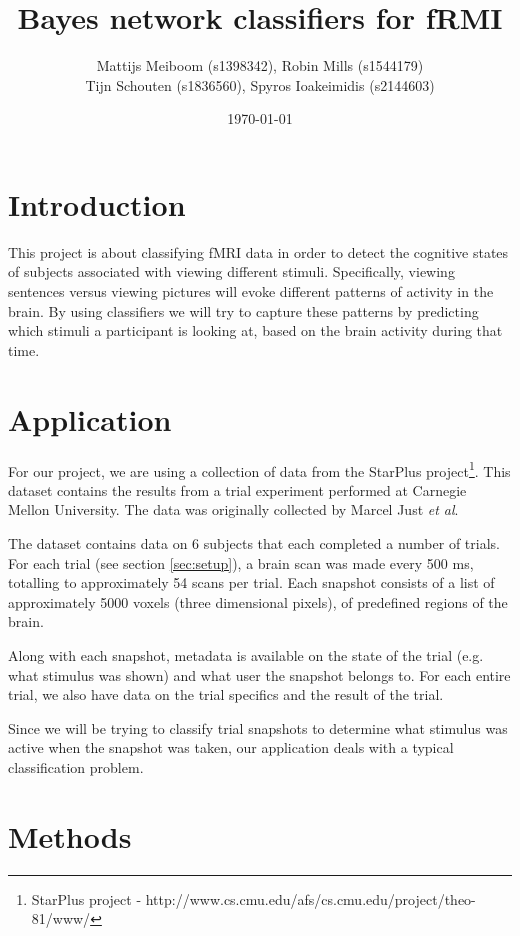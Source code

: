 \documentclass[a4paper, 11pt]{scrartcl}
\title{\Large Bayes network classifiers for fRMI}
\author{\small Mattijs Meiboom (s1398342), Robin Mills (s1544179)\\
			\small Tijn Schouten (s1836560), Spyros Ioakeimidis (s2144603)}
\date{\small \today}
\begin{document}
\maketitle

\thispagestyle{empty}

\section{Introduction}

This project is about classifying fMRI data in order to detect the cognitive states of subjects associated with viewing different stimuli. Specifically, viewing sentences versus viewing pictures will evoke different patterns of activity in the brain. By using classifiers we will try to capture these patterns by predicting which stimuli a participant is looking at, based on the brain activity during that time.

\section{Application}
\label{sec:application}

For our project, we are using a collection of data from the StarPlus project\footnote{StarPlus project - http://www.cs.cmu.edu/afs/cs.cmu.edu/project/theo-81/www/}. This dataset contains the results from a trial experiment performed at Carnegie Mellon University. The data was originally collected by Marcel Just \textit{et al}.

The dataset contains data on 6 subjects that each completed a number of trials. For each trial (see section \ref{sec:setup}), a brain scan was made every 500 ms, totalling to approximately 54 scans per trial. Each snapshot consists of a list of approximately 5000 voxels (three dimensional pixels), of predefined regions of the brain.

Along with each snapshot, metadata is available on the state of the trial (e.g. what stimulus was shown) and what user the snapshot belongs to. For each entire trial, we also have data on the trial specifics and the result of the trial.

Since we will be trying to classify trial snapshots to determine what stimulus was active when the snapshot was taken, our application deals with a typical classification problem.

\section{Methods}
\label{sec:methods}
\end{document}
